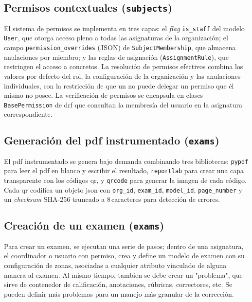 \subsection{Permisos contextuales (\texttt{subjects})}

El sistema de permisos se implementa en tres capas: el \textit{flag}
\texttt{is\_staff} del modelo \texttt{User}, que otorga acceso pleno
a todas las asignaturas de la organización; el campo
\texttt{permission\_overrides} (JSON) de \texttt{SubjectMembership},
que almacena anulaciones por miembro; y las reglas de asignación
(\texttt{AssignmentRule}), que restringen el acceso a
 concretos. La resolución de permisos efectivos
combina los valores por defecto del rol, la configuración de la
organización y las anulaciones individuales, con la restricción de que un
 no puede delegar un permiso que él mismo no posee.
La verificación de permisos se encapsula en clases \texttt{BasePermission}
de \acs{drf} que consultan
la membresía del usuario en la asignatura correspondiente.


\subsection{Generación del \acs{pdf} instrumentado (\texttt{exams})}

El \acs{pdf} instrumentado se genera bajo demanda combinando tres
bibliotecas: \texttt{pypdf} para leer el \acs{pdf} en blanco y
escribir el resultado, \texttt{reportlab} para crear una capa
transparente con los códigos \acs{qr}, y \texttt{qrcode} para generar
la imagen de cada código. Cada \acs{qr} codifica un objeto \acs{json}
con \texttt{org\_id}, \texttt{exam\_id}, \texttt{model\_id},
\texttt{page\_number} y un \textit{checksum} SHA-256 truncado a
8\,caracteres para detección de errores.

\subsection{Creación de un examen (\texttt{exams})}

Para crear un examen, se ejecutan una serie de pasos; dentro de una
asignatura, el coordinador o usuario con permiso, crea y define un
modelo de examen con su configuración de zonas, asociadas a cualquier
atributo vinculado de alguna manera al examen. Al mismo tiempo, tambien
se debe crear un "problema", que sirve de contenedor de calificación,
anotaciones, rúbricas, correctores, etc. Se pueden definir más problemas
para un manejo más granular de la corrección.

